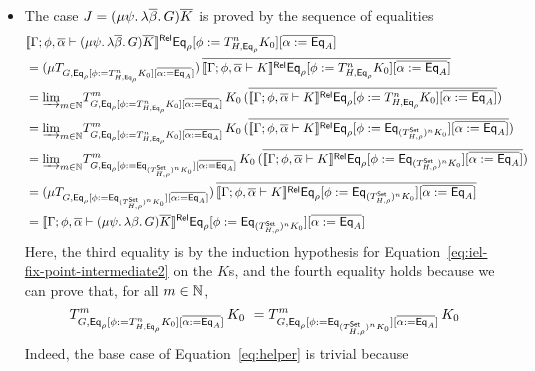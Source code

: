 \documentclass{lmcs}
\theoremstyle{plain}\newtheorem{satz}[thm]{Satz}
\newcommand{\set}{\mathsf{Set}}
\begin{document}
{\begin{itemize}
\begin{itemize}
\item 
  The case $J = (\mu \psi.\, \lambda \overline{\beta}.\, G) \overline{K}$
is proved by the sequence of equalities 
\[
\begin{split}
& \relsem{\Gamma; \phi, \ol{\alpha} \vdash (\mu \psi.\, \lambda
    \ol{\beta}.\, G) \ol{K}} 
  \Eq_{\rho} [\phi := T^{n}_{H,\Eq_{\rho}} K_0]
  [\overline{\alpha := \Eq_A}] \\
&= (\mu {T_{G, \Eq_{\rho}[\phi := T^{n}_{H,\Eq_{\rho}} K_0][\overline{\alpha := \Eq_A}]}})
  \,\ol{\relsem{\Gamma; \phi, \ol{\alpha} \vdash K}\Eq_{\rho}
  [\phi := T^{n}_{H,\Eq_{\rho}} K_0][\overline{\alpha := \Eq_A}]} \\ 
&= \colim{m \in \nat} {T^m_{G, \Eq_{\rho}[\phi := T^{n}_{H,\Eq_{\rho}} K_0][\overline{\alpha := \Eq_A}]}}\,K_0
  \,(\ol{\relsem{\Gamma; \phi, \ol{\alpha} \vdash K}\Eq_{\rho}
  [\phi := T^{n}_{H,\Eq_{\rho}} K_0][\overline{\alpha := \Eq_A}]}) \\ 
&= \colim{m \in \nat} {T^m_{G, \Eq_{\rho}[\phi := T^{n}_{H,\Eq_{\rho}} K_0][\overline{\alpha := \Eq_A}]}}\,K_0
  \,(\ol{\relsem{\Gamma; \phi, \ol{\alpha} \vdash K}\Eq_{\rho}
  [\phi := \Eq_{(T^{\set}_{H,\rho})^n K_0}][\overline{\alpha := \Eq_A}]}) \\  %
&= \colim{m \in \nat} {T^m_{G, \Eq_{\rho}[\phi := \Eq_{(T^{\set}_{H,\rho})^n K_0}][\overline{\alpha := \Eq_A}]}}\,K_0
  \,(\ol{\relsem{\Gamma; \phi, \ol{\alpha} \vdash K}\Eq_{\rho}
  [\phi := \Eq_{(T^{\set}_{H,\rho})^n K_0}][\overline{\alpha := \Eq_A}]}) \\ 
&= (\mu {T_{G, \Eq_{\rho}[\phi := \Eq_{(T^{\set}_{H,\rho})^n K_0}][\overline{\alpha := \Eq_A}]}})
  \,\ol{\relsem{\Gamma; \phi, \ol{\alpha} \vdash K}\Eq_{\rho}
  [\phi := \Eq_{(T^{\set}_{H,\rho})^n K_0}][\overline{\alpha := \Eq_A}]} \\ 
&= \relsem{\Gamma; \phi, \ol{\alpha} \vdash (\mu \psi.\, \lambda \beta.\, G) \ol{K}}
  \Eq_{\rho}[\phi := \Eq_{(T^{\set}_{H,\rho})^n K_0}][\overline{\alpha := \Eq_{A}}]
\end{split}
\]
Here, the third equality is by the induction hypothesis for
Equation~\ref{eq:iel-fix-point-intermediate2} on the $K$s, and the
fourth equality holds because we can prove that, for all $m \in \mathbb{N}$,
\begin{equation}\label{eq:helper}
T^m_{G,
\Eq_{\rho}[\phi := T^{n}_{H,\Eq_{\rho}} K_0][\overline{\alpha :=
    \Eq_A}]}\,K_0 \ = T^m_{G, \Eq_{\rho}[\phi :=
    \Eq_{(T^{\set}_{H,\rho})^n K_0}][\overline{\alpha :=
      \Eq_A}]}\,K_0
\end{equation}
Indeed, the base case of Equation~\ref{eq:helper} is trivial because

\end{itemize}
\end{itemize}}
\end{document}
